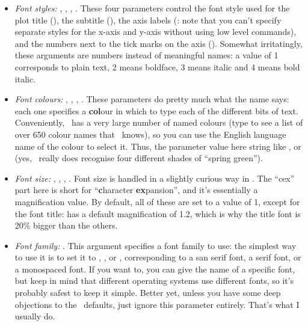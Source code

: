 \begin{itemize} 
\item {\it Font styles:} , , , . These four parameters control the font style used for the plot title (), the subtitle (), the axis labels (: note that you can't specify separate styles for the x-axis and y-axis without using low level commands), and the numbers next to the tick marks on the axis (). Somewhat irritatingly, these arguments are numbers instead of meaningful names:  a value of 1 corresponds to plain text, 2 means boldface, 3 means italic and 4 means bold italic.
\item {\it Font colours:} , , , . These parameters do pretty much what the name says: each one specifies a {\bf col}our in which to type each of the different bits of text. Conveniently, \R\ has a very large number of named colours (type  to see a list of over 650 colour names that \R\ knows), so you can use the English language name of the colour to select it. Thus, the parameter value here string like ,  or  (yes, \R\ really does recognise four different shades of ``spring green'').
\item {\it Font size:} , , , . Font size is handled in a slightly curious way in \R. The ``cex'' part here is short for ``{\bf c}haracter {\bf ex}pansion'', and it's essentially a magnification value. By default, all of these are set to a value of 1, except for the font title:  has a default magnification of 1.2, which is why the title font is 20\% bigger than the others. 
\item {\it Font family:} . This argument specifies a font family to use: the simplest way to use it is to set it to , , or , corresponding to a san serif font, a serif font, or a monospaced font. If you want to, you can give the name of a specific font, but keep in mind that different operating systems use different fonts, so it's probably safest to keep it simple. Better yet, unless you have some deep objections to the \R\ defaults, just ignore this parameter entirely. That's what I usually do.
\end{itemize}
